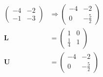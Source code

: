 \documentclass{article}
\begin{document}
\setcounter{subsubsection}{12}
\subsubsection{}

\begin{align*}
  \begin{pmatrix}
    -4 & -2 \\
    -1 & -3
  \end{pmatrix} & \Rightarrow \begin{pmatrix}
                                -4 & -2           \\
                                0  & -\frac{5}{2}
                              \end{pmatrix} \\
  \mathbf{L}      & = \begin{pmatrix}
                        1           & 0 \\
                        \frac{1}{4} & 1
                      \end{pmatrix}           \\
  \mathbf{U}      & = \begin{pmatrix}
                        -4 & -2           \\
                        0  & -\frac{5}{2}
                      \end{pmatrix}
\end{align*}

\setcounter{subsubsection}{20}
\subsubsection{}
\end{document}
